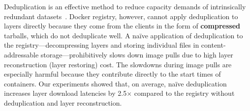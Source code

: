 
Deduplication is an effective method to reduce capacity demands of intrinsically redundant
datasets~\cite{paulo2014survey}.
%
%
%
Docker registry, however, cannot apply deduplication to layers directly 
because they come from the clients in the form of \textbf{compressed} tarballs,
which do not deduplicate well.
%
%
%
A na\"{i}ve application of deduplication to the registry---decompressing
layers and storing individual files in content-addressable storage---prohibitively
slows down image pulls due to high layer reconstruction 
(layer restoring) cost.
%
The slowdowns during image pulls are especially
harmful because they contribute directly to the start times of containers.
%
Our experiments showed that, on average, na\"{i}ve deduplication increases layer
download latencies by 2.5$\times$ compared to the registry without deduplication and layer reconstruction.

